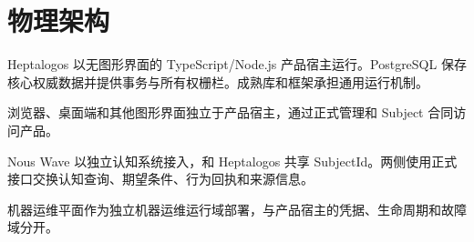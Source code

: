 \chapter{物理架构}

Heptalogos 以无图形界面的 TypeScript/Node.js 产品宿主运行。PostgreSQL 保存核心权威数据并提供事务与所有权栅栏。成熟库和框架承担通用运行机制。

浏览器、桌面端和其他图形界面独立于产品宿主，通过正式管理和 Subject 合同访问产品。

Nous Wave 以独立认知系统接入，和 Heptalogos 共享 SubjectId。两侧使用正式接口交换认知查询、期望条件、行为回执和来源信息。

机器运维平面作为独立机器运维运行域部署，与产品宿主的凭据、生命周期和故障域分开。
